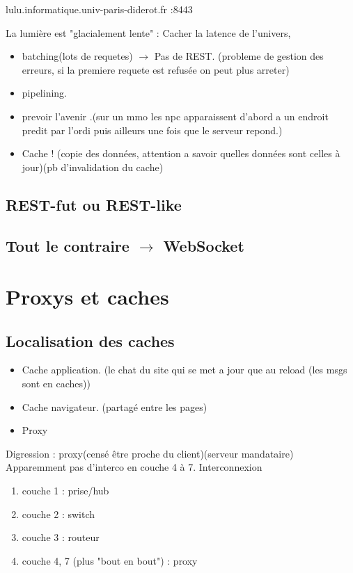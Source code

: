 \documentclass[12pt]{article}
\theoremstyle{plain}
\theoremstyle{definition}
\theoremstyle{remark}
\begin{document}
lulu.informatique.univ-paris-diderot.fr :8443

La lumière est "glacialement lente" : Cacher la latence de l'univers,
\begin{itemize}
    \item batching(lots de requetes) $\rightarrow$ Pas de REST. (probleme de gestion des erreurs, si la premiere requete est refusée on peut plus arreter)
    \item pipelining.
    \item prevoir l'avenir .(sur un mmo les npc apparaissent d'abord a un endroit predit par l'ordi puis ailleurs une fois que le serveur repond.)
    \item Cache ! (copie des données, attention a savoir quelles données sont celles à jour)(pb d'invalidation du cache)
\end{itemize}
\subsection{REST-fut ou REST-like}

\subsection{Tout le contraire $\rightarrow$ WebSocket}

\section{Proxys et caches}
\subsection{Localisation des caches}

\begin{itemize}
    \item Cache application. (le chat du site qui se met a jour que au reload (les msgs sont en caches))
    \item Cache navigateur. (partagé entre les pages)
    \item Proxy
\end{itemize}

Digression : proxy(censé être proche du client)(serveur mandataire)\\

Apparemment pas d'interco en couche 4 à 7.
Interconnexion \begin{enumerate}
    \item couche 1 : prise/hub 
    \item couche 2 : switch
    \item couche 3 : routeur
    \item couche 4, 7 (plus "bout en bout") : proxy
\end{enumerate}
\end{document}

